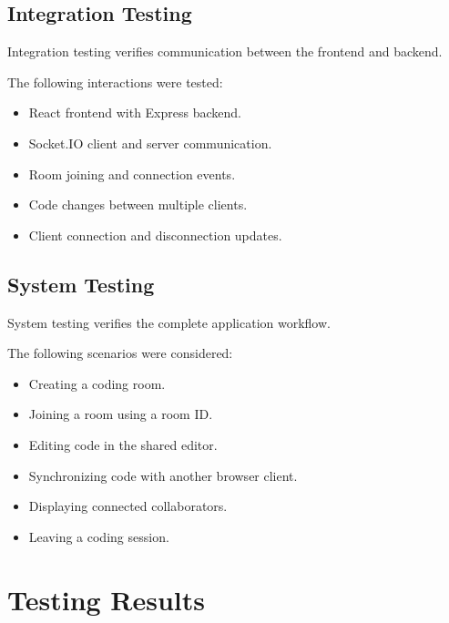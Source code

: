 \documentclass[12pt,a4paper,oneside]{report}
\begin{document}
\subsection{Integration Testing}

Integration testing verifies communication between the frontend and backend.

The following interactions were tested:

\begin{itemize}
    \item React frontend with Express backend.
    \item Socket.IO client and server communication.
    \item Room joining and connection events.
    \item Code changes between multiple clients.
    \item Client connection and disconnection updates.
\end{itemize}

\subsection{System Testing}

System testing verifies the complete application workflow.

The following scenarios were considered:

\begin{itemize}
    \item Creating a coding room.
    \item Joining a room using a room ID.
    \item Editing code in the shared editor.
    \item Synchronizing code with another browser client.
    \item Displaying connected collaborators.
    \item Leaving a coding session.
\end{itemize}

\section{Testing Results}
\end{document}
